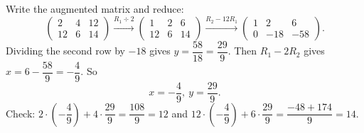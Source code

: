 Write the augmented matrix and reduce:
\[
\left(\begin{array}{cc|c}2&4&12\\12&6&14\end{array}\right)
\xrightarrow{R_1\div2}
\left(\begin{array}{cc|c}1&2&6\\12&6&14\end{array}\right)
\xrightarrow{R_2-12R_1}
\left(\begin{array}{cc|c}1&2&6\\0&-18&-58\end{array}\right).
\]
Dividing the second row by $-18$ gives $y=\dfrac{58}{18}=\dfrac{29}{9}$. Then $R_1-2R_2$ gives $x=6-\dfrac{58}{9}=-\dfrac{4}{9}$. So
\[
\boxed{x=-\dfrac{4}{9},\ y=\dfrac{29}{9}}.
\]
Check: $2\cdot\left(-\dfrac{4}{9}\right)+4\cdot\dfrac{29}{9}=\dfrac{108}{9}=12$ and $12\cdot\left(-\dfrac{4}{9}\right)+6\cdot\dfrac{29}{9}=\dfrac{-48+174}{9}=14$.
